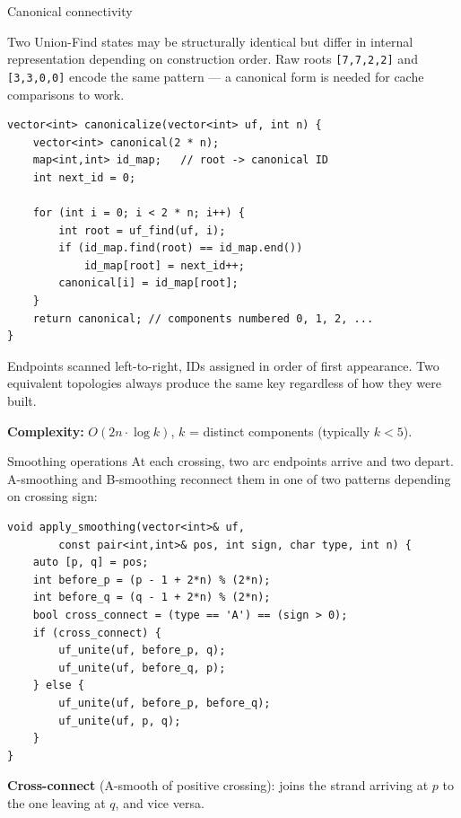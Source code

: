 \documentclass[final]{beamer}
\newlength{\colwidth}
\begin{document}
\begin{frame}[t,fragile]
\begin{columns}[t]
\begin{column}{\colwidth}
  \begin{block}{Canonical connectivity}

    Two Union-Find states may be structurally identical but differ in internal representation depending on construction order. Raw roots \texttt{[7,7,2,2]} and \texttt{[3,3,0,0]} encode the same pattern --- a canonical form is needed for cache comparisons to work.


\begin{lstlisting}
vector<int> canonicalize(vector<int> uf, int n) {
    vector<int> canonical(2 * n);
    map<int,int> id_map;   // root -> canonical ID
    int next_id = 0;

    for (int i = 0; i < 2 * n; i++) {
        int root = uf_find(uf, i);
        if (id_map.find(root) == id_map.end())
            id_map[root] = next_id++;
        canonical[i] = id_map[root];
    }
    return canonical; // components numbered 0, 1, 2, ...
}
\end{lstlisting}

    \vspace{0.1cm}
    Endpoints scanned left-to-right, IDs assigned in order of first appearance. Two equivalent topologies always produce the same key regardless of how they were built.

    \textbf{Complexity:} $O(2n \cdot \log k)$, $k$ = distinct components (typically $k < 5$).
  \end{block}

  \begin{block}{Smoothing operations}
    At each crossing, two arc endpoints arrive and two depart. A-smoothing and B-smoothing reconnect them in one of two patterns depending on crossing sign:

\begin{lstlisting}
void apply_smoothing(vector<int>& uf,
        const pair<int,int>& pos, int sign, char type, int n) {
    auto [p, q] = pos;
    int before_p = (p - 1 + 2*n) % (2*n);
    int before_q = (q - 1 + 2*n) % (2*n);
    bool cross_connect = (type == 'A') == (sign > 0);
    if (cross_connect) {
        uf_unite(uf, before_p, q);
        uf_unite(uf, before_q, p);
    } else {
        uf_unite(uf, before_p, before_q);
        uf_unite(uf, p, q);
    }
}
\end{lstlisting}

    \vspace{0.1cm}
    \textbf{Cross-connect} (A-smooth of positive crossing): joins the strand arriving at $p$ to the one leaving at $q$, and vice versa.
    

\end{block}
\end{column}
\end{columns}
\end{frame}
\end{document}
